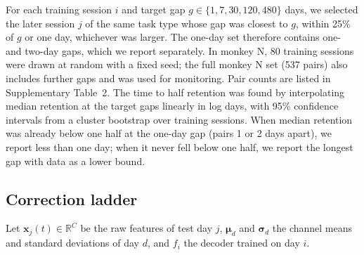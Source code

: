 \documentclass{iopjournal}
\begin{document}
For each training session $i$ and target gap $g \in \{1, 7, 30, 120, 480\}$ days, we selected the later session $j$ of
the same task type whose gap was closest to $g$, within 25\% of $g$ or one day, whichever was larger. The one-day set
therefore contains one- and two-day gaps, which we report separately. In monkey N, 80 training sessions were drawn at
random with a fixed seed; the full monkey N set (537 pairs) also includes further gaps and was used for monitoring. Pair
counts are listed in Supplementary Table~2. The time to half retention was found by interpolating median retention at
the target gaps linearly in log days, with 95\% confidence intervals from a cluster bootstrap over training sessions.
When median retention was already below one half at the one-day gap (pairs 1 or 2 days apart), we report less than one
day; when it never fell below one half, we report the longest gap with data as a lower bound.

\subsection{Correction ladder}

Let $\mathbf{x}_j(t) \in \mathbb{R}^C$ be the raw features of test day $j$, $\boldsymbol{\mu}_d$ and
$\boldsymbol{\sigma}_d$ the channel means and standard deviations of day $d$, and $f_i$ the decoder trained on day $i$.
\end{document}
